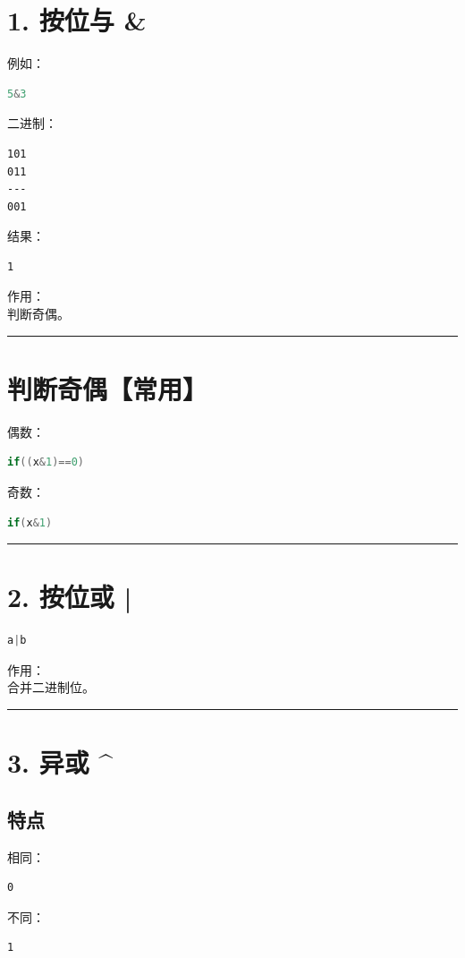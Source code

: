 \documentclass[10pt,twocolumn]{extarticle}
\begin{document}
\section{1. 按位与 \&}

例如：
\begin{lstlisting}[language=C++]
5&3
\end{lstlisting}
二进制：
\begin{lstlisting}
101
011
---
001
\end{lstlisting}
结果：
\begin{lstlisting}
1
\end{lstlisting}
作用：\\
判断奇偶。

\noindent\rule{\linewidth}{0.4pt}

\section{判断奇偶\textbf{【常用】}}

偶数：
\begin{lstlisting}[language=C++]
if((x&1)==0)
\end{lstlisting}
奇数：
\begin{lstlisting}[language=C++]
if(x&1)
\end{lstlisting}

\noindent\rule{\linewidth}{0.4pt}

\section{2. 按位或 |}
\begin{lstlisting}[language=C++]
a|b
\end{lstlisting}
作用：\\
合并二进制位。

\noindent\rule{\linewidth}{0.4pt}

\section{3. 异或 \textasciicircum{}}

\subsection{特点}
相同：
\begin{lstlisting}
0
\end{lstlisting}
不同：
\begin{lstlisting}
1
\end{lstlisting}
\end{document}
